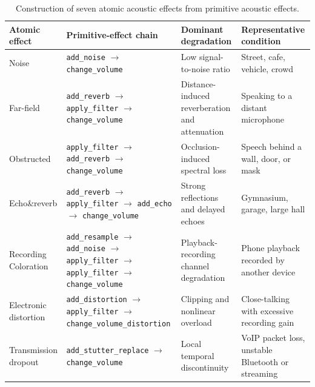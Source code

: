 \documentclass{llmxive}
\providecommand{\arraystretch}{1.05}
\begin{document}
\begin{table}[t]
\centering
\small
\setlength{\tabcolsep}{4pt}
\renewcommand{\arraystretch}{1.15}
\begin{tabular}{p{} p{} p{} p{}}
\toprule
\textbf{Atomic effect} & \textbf{Primitive-effect chain} & \textbf{Dominant degradation} & \textbf{Representative condition} \\
\midrule
Noise
& \texttt{add\_noise} $\rightarrow$ \texttt{change\_volume}
& Low signal-to-noise ratio
& Street, cafe, vehicle, crowd \\

Far-field
& \texttt{add\_reverb} $\rightarrow$ \texttt{apply\_filter} $\rightarrow$ \texttt{change\_volume}
& Distance-induced reverberation and attenuation
& Speaking to a distant microphone \\

Obstructed
& \texttt{apply\_filter} $\rightarrow$ \texttt{add\_reverb} $\rightarrow$ \texttt{change\_volume}
& Occlusion-induced spectral loss
& Speech behind a wall, door, or mask \\

Echo\&reverb
& \texttt{add\_reverb} $\rightarrow$ \texttt{apply\_filter} $\rightarrow$ \texttt{add\_echo} $\rightarrow$ \texttt{change\_volume}
& Strong reflections and delayed echoes
& Gymnasium, garage, large hall \\

Recording Coloration
& \texttt{add\_resample} $\rightarrow$ \texttt{add\_noise} $\rightarrow$ \texttt{apply\_filter} $\rightarrow$ \texttt{apply\_filter} $\rightarrow$ \texttt{change\_volume}
& Playback-recording channel degradation
& Phone playback recorded by another device \\

Electronic distortion
& \texttt{add\_distortion} $\rightarrow$ \texttt{apply\_filter} $\rightarrow$ \texttt{change\_volume\_distortion}
& Clipping and nonlinear overload
& Close-talking with excessive recording gain \\

Transmission dropout
& \texttt{add\_stutter\_replace} $\rightarrow$ \texttt{change\_volume}
& Local temporal discontinuity
& VoIP packet loss, unstable Bluetooth or streaming \\
\bottomrule
\end{tabular}
\caption{Construction of seven atomic acoustic effects from primitive acoustic effects.}
\label{tab:atomic_effect_chains}
\end{table}
\end{document}
